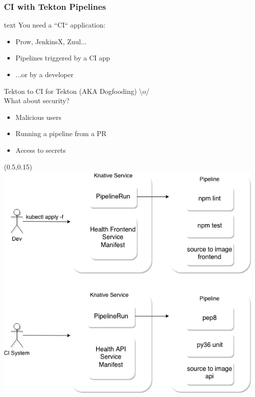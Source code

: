 \documentclass[aspectratio=169,11pt,hyperref={colorlinks=true}]{beamer}
\begin{document}
\begin{lblackrwhiteframe}
\begin{blackframe}
\begin{lblackrwhiteframe}
  \frametitle{CI with Tekton Pipelines}
  \large
  \begin{beamercolorbox}[wd=0.45\paperwidth]{text}
    You need a ``CI`` application: \\
    \begin{itemize}
      \item Prow, JenkinsX, Zuul...
      \item Pipelines triggered by a CI app
      \item ...or by a developer
    \end{itemize}
    \vspace{3ex}
    Tekton to CI for Tekton (AKA Dogfooding) \textbackslash o/ \\
    \vspace{3ex}
    What about security?
    \begin{itemize}
      \item Malicious users
      \item Running a pipeline from a PR
      \item Access to secrets
    \end{itemize}
  \end{beamercolorbox}%
  \begin{textblock*}{0.5\paperwidth}(0.5\paperwidth,0.15\paperheight)
    \centering
    \includegraphics[width=0.45\paperwidth]{img/tekton_ci.png}
  \end{textblock*}
\end{lblackrwhiteframe}


\end{blackframe}
\end{lblackrwhiteframe}
\end{document}

